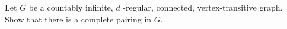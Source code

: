 Let $ G $ be a countably infinite, $ d $ -regular, connected, vertex-transitive graph. Show that there is a complete pairing in $ G $.
